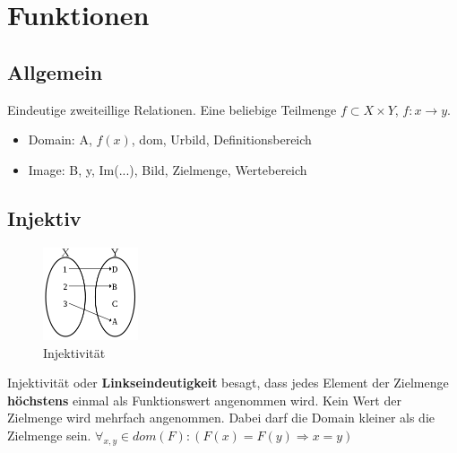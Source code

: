 \section{Funktionen}
\subsection{Allgemein}
    Eindeutige zweiteillige Relationen. Eine beliebige Teilmenge \(f
    \subset X \times Y \), \(f: x \rightarrow y \).\newline
    \begin{itemize}
      \item Domain: A, \(f(x)\), dom, Urbild, Definitionsbereich
      \item Image: B, y, Im(...), Bild, Zielmenge, Wertebereich
    \end{itemize}


\subsection{Injektiv}
\begin{figure}
  \vspace{-20pt}
  \begin{center}
    \includegraphics[width=0.25\textwidth]{Bilder/injektiv}
  \end{center}
  \vspace{-20pt}
  \caption{Injektivität}
  \vspace{-10pt}
\end{figure}
Injektivität oder \textbf{Linkseindeutigkeit} besagt, dass jedes
    Element der Zielmenge \textbf{höchstens} einmal als Funktionswert angenommen
    wird. Kein Wert der Zielmenge wird mehrfach angenommen. Dabei darf die Domain kleiner als die Zielmenge sein.\newline
\( \forall_{x,y} \in dom(F): (F(x) = F(y) \Rightarrow x = y) \)
\newline

